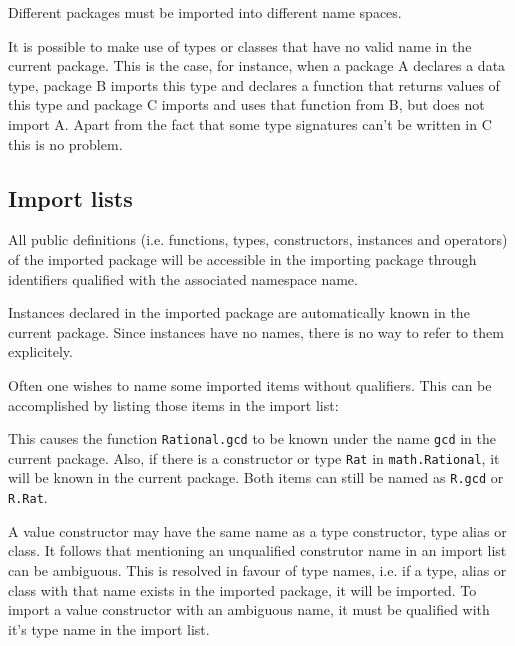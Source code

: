 Different packages must be imported into different name spaces.

It is possible to make use of types or classes that have no valid name in the current package. This is the case, for instance, when a package A declares a data type, package B imports this type and declares a function that returns values of this type and package C imports and uses that function from B, but does not import A. Apart from the fact that some type signatures can't be written in C this is no problem.

\subsection{Import lists}

All public definitions (i.e. functions, types, constructors,
instances and operators) of the imported package will be accessible in
the importing package through identifiers qualified with the associated
namespace name.

Instances declared in the imported package are automatically known in the current package. Since instances have no names, there is no way to refer to them explicitely.

Often one wishes to name some imported items without qualifiers. This
can be accomplished by listing those items in the import list:


This causes the function {\tt Rational.gcd} to be known under the
name {\tt gcd} in the current package. Also, if there is a constructor
or type {\tt Rat} in {\tt math.Rational}, it will be known in the
current package. Both items can still be named as {\tt R.gcd} or {\tt
R.Rat}.

A value constructor may have the same name as a type constructor, type alias or class. It follows that mentioning an unqualified construtor name in an import list can be ambiguous. This is resolved in favour of type names, i.e. if a type, alias  or class with that name exists in the imported package, it will be imported. To import a value constructor with an ambiguous name, it must be qualified with it's type name in the import list.


